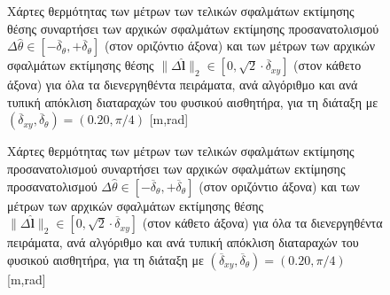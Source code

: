 \begin{figure}\vspace{1cm}\hspace{0.5cm}
  
  \vspace{1cm}
  \caption{\small Χάρτες θερμότητας των μέτρων των τελικών σφαλμάτων εκτίμησης
           θέσης συναρτήσει των αρχικών σφαλμάτων εκτίμησης προσανατολισμού
           $\Delta\hat{\theta} \in
           [-\overline{\delta}_{\theta},+\overline{\delta}_{\theta}]$ (στον
           οριζόντιο άξονα) και των μέτρων των αρχικών σφαλμάτων εκτίμησης
           θέσης $\|\Delta \hat{\bm{l}}\|_2 \in [0, \sqrt{2}\cdot
           \overline{\delta}_{xy}]$ (στον κάθετο άξονα) για όλα τα
           διενεργηθέντα πειράματα, ανά αλγόριθμο και ανά τυπική απόκλιση
           διαταραχών του φυσικού αισθητήρα, για τη διάταξη με
           $(\overline{\delta}_{xy}, \overline{\delta}_{\theta}) = (0.20,
           \pi/4)$ [m,rad]}
  \label{fig:02_05_03:02:04}
\end{figure}


\begin{figure}\vspace{1cm}\hspace{0.5cm}
  
  \vspace{1cm}
  \caption{\small Χάρτες θερμότητας των μέτρων των τελικών σφαλμάτων εκτίμησης
           προσανατολισμού συναρτήσει των αρχικών σφαλμάτων εκτίμησης
           προσανατολισμού $\Delta\hat{\theta} \in
           [-\overline{\delta}_{\theta},+\overline{\delta}_{\theta}]$ (στον
           οριζόντιο άξονα) και των μέτρων των αρχικών σφαλμάτων εκτίμησης
           θέσης $\|\Delta \hat{\bm{l}}\|_2 \in [0, \sqrt{2}\cdot
           \overline{\delta}_{xy}]$ (στον κάθετο άξονα) για όλα τα
           διενεργηθέντα πειράματα, ανά αλγόριθμο και ανά τυπική απόκλιση
           διαταραχών του φυσικού αισθητήρα, για τη διάταξη με
           $(\overline{\delta}_{xy}, \overline{\delta}_{\theta}) = (0.20,
           \pi/4)$ [m,rad]}
  \label{fig:02_05_03:02:05}
\end{figure}


